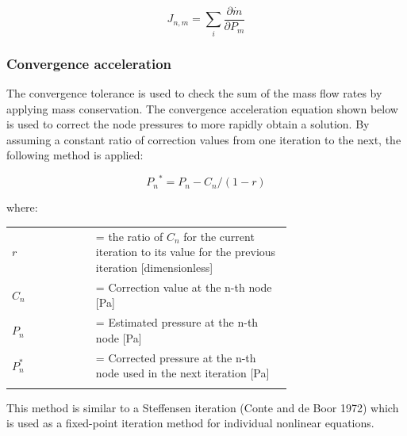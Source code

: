 \begin{equation}
J_{n,m} = \sum_{i} \frac{\partial \dot{m}}{\partial P_m}
\end{equation}

\subsubsection{Convergence acceleration}\label{convergence-acceleration}

The convergence tolerance is used to check the sum of the mass flow rates by applying mass conservation. The convergence acceleration equation shown below is used to correct the node pressures to more rapidly obtain a solution. By assuming a constant ratio of correction values from one iteration to the next, the following method is applied:

\begin{equation}
{P_n}^* = P_n - C_n/(1 - r)
\end{equation}

where:

\begin{tabular}{lp{0.7\linewidth}}
\\
$r$ &= the ratio of $C_n$ for the current iteration to its value for the previous iteration [dimensionless]\\
$C_n$ &= Correction value at the n-th node [Pa]\\
$P_n$ &= Estimated pressure at the n-th node [Pa]\\
$P_n^*$ &= Corrected pressure at the n-th node used in the next iteration [Pa]\\
\\
\end{tabular}

This method is similar to a Steffensen iteration (Conte and de Boor 1972) which is used as a fixed-point iteration method for individual nonlinear equations.

